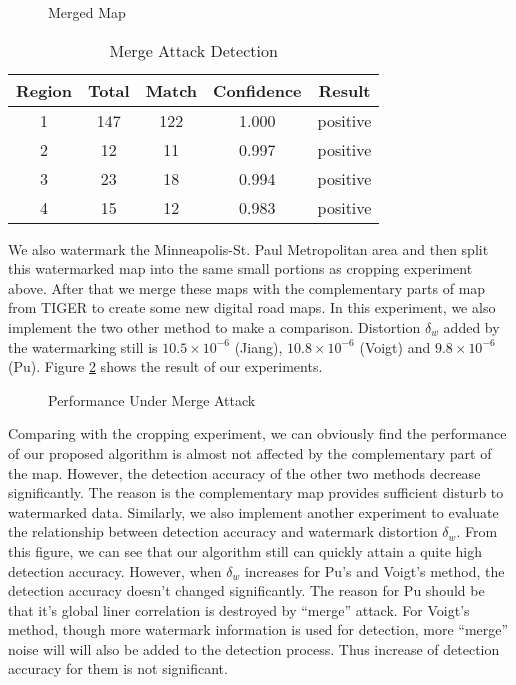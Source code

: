 \begin{figure}[th]
\centering
{}
\caption{Merged Map}
\label{fig:mergeexp1}
\end{figure}


\begin{table}[th]
\centering
\caption{Merge Attack Detection}
\label{tab:merge}
\begin{tabular}{|c||c|c|c|c|} 
\hline
Region & Total & Match & Confidence & Result \\\hline \hline
1 & 147 & 122 & 1.000 & positive\\\hline
2 & 12 & 11 & 0.997 & positive\\\hline
3 & 23 & 18 & 0.994 & positive\\\hline
4 & 15 & 12 & 0.983 & positive\\\hline
\end{tabular}
\end{table}

We also watermark the Minneapolis-St. Paul Metropolitan area and then split this 
watermarked map into the same small portions as cropping experiment above. After 
that we merge these maps with the complementary parts of map from TIGER to create 
some new digital road maps. In this experiment, we also implement the two other 
method to make a comparison. Distortion $\delta_w$ added by the watermarking still
is $10.5\times 10^{ -6 }$ (Jiang), $10.8\times 10^{-6}$ (Voigt) and $9.8\times 10^{-6}$ (Pu). 
Figure \ref{fig:mergeattack} shows the result of our 
experiments.
\begin{figure}[th]
\centering
{}
\caption{Performance Under Merge Attack}
\label{fig:mergeattack}
\end{figure}

Comparing with the cropping experiment, we can obviously find the performance of 
our proposed algorithm is almost not affected by the complementary part of the map. 
However, the detection accuracy of the other two methods decrease significantly. 
The reason is the complementary map provides sufficient disturb to watermarked data.
Similarly, we also implement another experiment to evaluate the relationship between
detection accuracy and watermark distortion $\delta_w$. From this figure, we can see that
our algorithm still can quickly attain a quite high detection accuracy. However, when 
$\delta_w$ increases for Pu's and Voigt's method, the detection accuracy doesn't changed significantly.
The reason for Pu should be that it's global liner correlation is destroyed by ``merge'' attack.
For Voigt's method, though more watermark information is used for detection, more ``merge'' 
noise will will also be added to the detection process. Thus increase of detection accuracy
for them is not significant.



